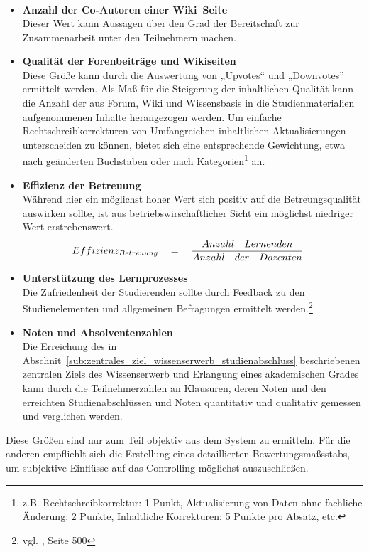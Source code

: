 \begin{itemize}
\begin{align}
\end{align}
	\item \textbf{Anzahl der Co-Autoren einer Wiki–Seite}\\ Dieser Wert kann Aussagen über den Grad der Bereitschaft zur Zusammenarbeit unter den Teilnehmern machen.
	\item \textbf{Qualität der Forenbeiträge und Wikiseiten}\\ Diese Größe kann durch die Auswertung von „Upvotes“ und „Downvotes” ermittelt werden. Als Maß für die Steigerung der inhaltlichen Qualität kann die Anzahl der aus Forum, Wiki und Wissensbasis in die Studienmaterialien aufgenommenen Inhalte herangezogen werden. Um einfache Rechtschreibkorrekturen von Umfangreichen inhaltlichen Aktualisierungen unterscheiden zu können, bietet sich eine entsprechende Gewichtung, etwa nach geänderten Buchstaben oder nach Kategorien\footnote{z.B. Rechtschreibkorrektur: 1 Punkt, Aktualisierung von Daten ohne fachliche Änderung: 2 Punkte, Inhaltliche Korrekturen: 5 Punkte pro Absatz, etc.} an.
	\item \textbf{Effizienz der Betreuung}\\ Während hier ein möglichst hoher Wert sich positiv auf die Betreungsqualität auswirken sollte, ist aus betriebswirschaftlicher Sicht ein möglichst niedriger Wert erstrebenswert.
\begin{align}
	Effizienz_{ Betreuung }\quad &=\quad \frac { Anzahl\quad Lernenden }{ Anzahl\quad der\quad Dozenten } \notag
\end{align}	
	\item \textbf{Unterstützung des Lernprozesses}\\ Die Zufriedenheit der Studierenden sollte durch Feedback zu den Studienelementen und allgemeinen Befragungen ermittelt werden.\footnote{vgl. \cite{euler}, Seite 500}
	\item \textbf{Noten und Absolventenzahlen}\\ Die Erreichung des in Abschnit~\ref{sub:zentrales_ziel_wissenserwerb_studienabschluss} beschriebenen zentralen Ziels des Wissenserwerb und Erlangung eines akademischen Grades kann durch die Teilnehmerzahlen an Klausuren, deren Noten und den erreichten Studienabschlüssen und Noten quantitativ und qualitativ gemessen und verglichen werden. 
\end{itemize}

Diese Größen sind nur zum Teil objektiv aus dem System zu ermitteln. Für die anderen empfliehlt sich die Erstellung eines detaillierten Bewertungsmaßsstabs, um subjektive Einflüsse auf das Controlling möglichst auszuschließen.


